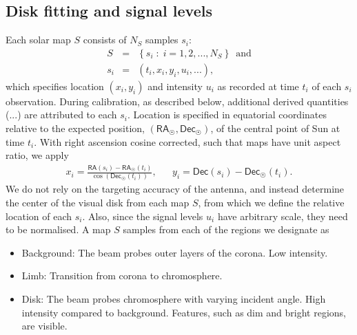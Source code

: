 \documentclass{aa}
\newcommand{\eqnl}[2]{\begin{eqnarray}\label{#1}#2\end{eqnarray}}
\newcommand{\RA}{{\mathsf{RA}}}
\newcommand{\Dec}{{\mathsf{Dec}}}
\begin{document}
  \subsection{Disk fitting and signal levels} \label{sect:disk}

    

  Each solar map $S$ consists of $N_S$ samples $s_i$:
  \eqnl{radio_sample}{
    S &=& \left\{ s_i \;:\; i = 1, 2, ..., N_S \right\}\,\text{ and}\nonumber\\
    s_i &=& \left( t_i, x_i, y_i, u_i, ... \right),
  }
which specifies location $(x_i,y_i)$ and intensity $u_i$ as recorded at time
$t_i$ of each $s_i$ observation.
During calibration, as described below, additional derived quantities ($...$)
are attributed to each $s_i$.
Location is specified in equatorial coordinates relative to the expected
position, $(\RA_{\astrosun}, \Dec_{\astrosun})$, of the central point of Sun
at time $t_i$.
With right ascension cosine corrected, such that maps have unit aspect ratio, we apply 
\eqnl{relative_radec}{
  x_i = \frac{\RA(s_i)
      - \RA_{\astrosun}(t_i)}{\cos \left( \Dec_{\astrosun}(t_i) \right)}, &&
  y_i = \Dec(s_i) - \Dec_{\astrosun}(t_i)\text{.}
  }
  We do not rely on the targeting accuracy of the antenna, and instead
  determine the center of the visual disk from each map $S$, from which we
  define the relative location of each $s_i$.
  Also, since the signal levels $u_i$ have arbitrary scale, 
  they need to be normalised.
  A map $S$ samples from each of the regions we designate as
  \begin{itemize}
  \item Background: The beam probes outer layers of the corona. Low intensity.
  \item Limb: Transition from corona to chromosphere.
  \item Disk: The beam probes chromosphere with varying incident angle. High intensity compared to background. Features, such as dim and bright regions, are visible.
  \end{itemize}
\end{document}
